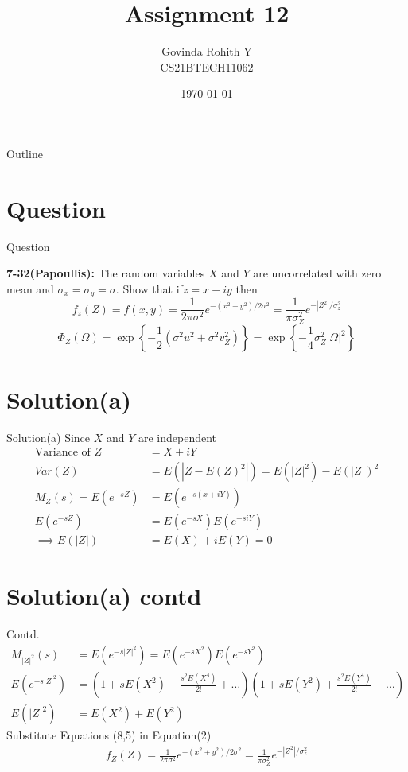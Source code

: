 \documentclass{beamer}
\title{Assignment 12}
\author{Govinda Rohith Y\\CS21BTECH11062}
\date{\today}
\providecommand{\abs}[1]{\left\vert#1\right\vert}
\begin{document}
\begin{frame}
    \titlepage 
\end{frame}

\logo{}


\begin{frame}{Outline}
    \tableofcontents
\end{frame}


\section{Question}
\begin{frame}{Question}

\begin{block}{\textbf{7-32(Papoullis):}}
         The random variables $X$ and $Y$ are uncorrelated with zero mean and $\sigma_x=\sigma_y=\sigma$. Show that
if$z=x+iy$ then
$$f_z(Z)=f(x,y)=\frac{1}{2\pi\sigma^2}e^{-(x^2+y^2)/2\sigma^2}=\frac{1}{\pi\sigma_Z^2}e^{-\abs{Z^2}/\sigma_z^2}$$
$$\Phi_Z{(\Omega)}=\exp{\left\{-\frac{1}{2}(\sigma^2u^2+\sigma^2v^2_Z)\right\}}=\exp{\left\{-\frac{1}{4}\sigma_Z^2\abs{\Omega}^2\right\}}$$
    \end{block}
\section{Solution(a)}
\end{frame}
\begin{frame}{Solution(a)}
    Since $X$ and $Y$ are independent
    \begin{align}
        \text{Variance of } Z&=X+iY\\
        Var(Z)&=E(\abs{Z-E(Z)^2})=E(\abs{Z}^2)-E(\abs{Z})^2\\
      M_Z(s)=E(e^{-sZ})&=E(e^{-s(x+iY)})\\
      E(e^{-sZ})&=E(e^{-sX})E(e^{-siY})\\
      \implies E(\abs{Z})&=E(X)+iE(Y)=0
    \end{align}
\end{frame}
\section{Solution(a) contd}
\begin{frame}{Contd.}
    \begin{align}
        M_{\abs{Z}^2}(s)&=E(e^{-s\abs{Z}^2})=E(e^{-sX^2})E(e^{-sY^2})\\
        E(e^{-s\abs{Z}^2})&=\left(1+sE(X^2)+\frac{s^2E(X^4)}{2!}+\ldots\right)\left(1+sE(Y^2)+\frac{s^2E(Y^4)}{2!}+\ldots\right)\\
         E(\abs{Z}^2)&=E(X^2)+E(Y^2)
    \end{align}
    Substitute Equations (8,5) in Equation(2)
 \begin{align}
     f_Z(Z)=\frac{1}{2\pi\sigma^2}e^{-(x^2+y^2)/2\sigma^2}=\frac{1}{\pi\sigma_Z^2}e^{-\abs{Z^2}/\sigma_z^2}
 \end{align}
\end{frame}
\end{document}
